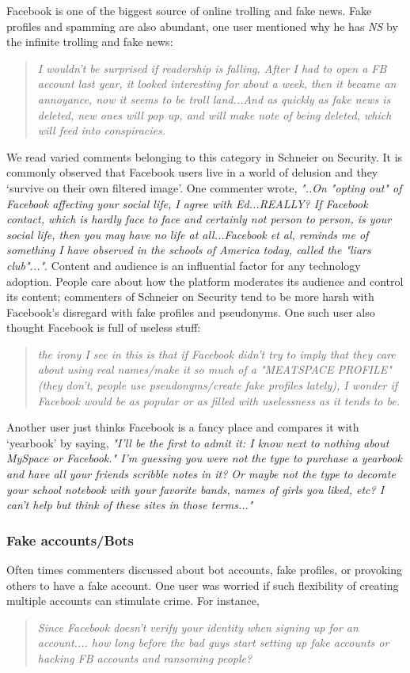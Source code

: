 Facebook is one of the biggest source of online trolling and fake news. Fake profiles and spamming are also abundant, one user mentioned why he has \emph{NS} by the infinite trolling and fake news:

\begin{quote}
         \textit{I wouldn't be surprised if readership is falling. After I had to open a FB account last year, it looked interesting for about a week, then it became an annoyance, now it seems to be troll land...And as quickly as fake news is deleted, new ones will pop up, and will make note of being deleted, which will feed into conspiracies.}
    \end{quote}

We read varied comments belonging to this category in Schneier on Security. It is commonly observed that Facebook users live in a world of delusion and they `survive on their own filtered image'. One commenter wrote, \textit{"..On "opting out" of Facebook affecting your social life, I agree with Ed...REALLY? If Facebook contact, which is hardly face to face and certainly not person to person, is your social life, then you may have no life at all...Facebook et al, reminds me of something I have observed in the schools of America today, called the "liars club"..."}. Content and audience is an influential factor for any technology adoption. People care about how the platform moderates its audience and control its content; commenters of Schneier on Security tend to be more harsh with Facebook's disregard with fake profiles and pseudonyms. One such user also thought Facebook is full of useless stuff:
\begin{quote}
         \textit{the irony I see in this is that if Facebook didn't try to imply that they care about using real names/make it so much of a "MEATSPACE PROFILE" (they don't, people use pseudonyms/create fake profiles lately), I wonder if Facebook would be as popular or as filled with uselessness as it tends to be.}
    \end{quote}
Another user just thinks Facebook is a fancy place and compares it with `yearbook' by saying, \textit{"I'll be the first to admit it: I know next to nothing about MySpace or Facebook." I'm guessing you were not the type to purchase a yearbook and have all your friends scribble notes in it? Or maybe not the type to decorate your school notebook with your favorite bands, names of girls you liked, etc? I can't help but think of these sites in those terms..."}

 \subsubsection{Fake accounts/Bots}
 Often times commenters discussed about bot accounts, fake profiles, or provoking others to have a fake account. One user was worried if such flexibility of creating multiple accounts can stimulate crime. For instance,
     \begin{quote}
         \textit{Since Facebook doesn't verify your identity when signing up for an account.... how long before the bad guys start setting up fake accounts or hacking FB accounts and ransoming people? }
     \end{quote}
    
